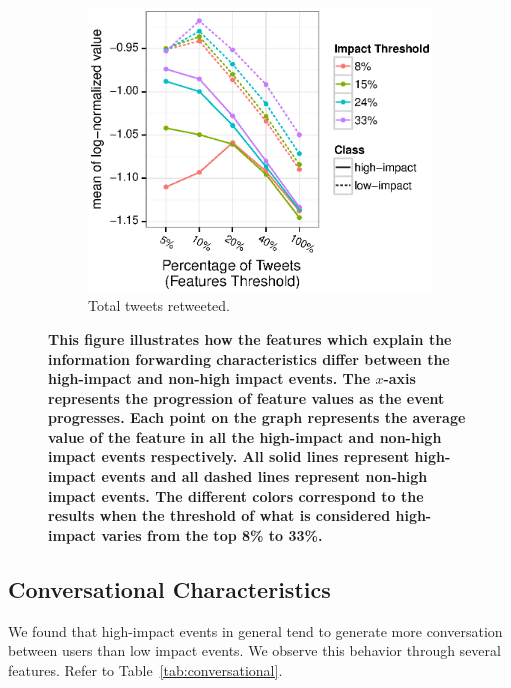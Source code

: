 \documentclass[10pt,letterpaper]{article}
\begin{document}
\begin{figure}
  \begin{subfigure}[b]{0.45\textwidth}
    \includegraphics[width=\textwidth]{figures_SI/Plots_from_data/total_tweets_retweeted.eps}
    \caption{Total tweets retweeted.} \label{fig:feat_tweets_rt}
  \end{subfigure}
  \caption{\textbf{This figure illustrates how the features which
      explain the information forwarding characteristics differ
      between the high-impact and non-high impact events. The $x$-axis
      represents the progression of feature values as the event
      progresses. Each point on the graph represents the average value
      of the feature in all the high-impact and non-high impact events
      respectively. All solid lines represent high-impact events and
      all dashed lines represent non-high impact events. The different
      colors correspond to the results when the threshold of what is
      considered high-impact varies from the top 8\% to 33\%.
    }}\label{fig:info_forward_hypothesis}
\end{figure}

\subsection{Conversational Characteristics}
\label{subsec:conversational}
We found that high-impact events in general tend to generate more
conversation between users than low impact events. We observe this
behavior through several features. Refer to
Table~\ref{tab:conversational}.
\end{document}
